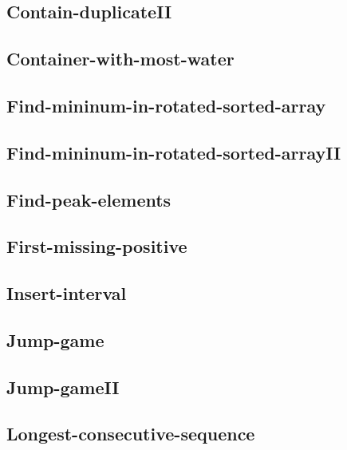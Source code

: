 \documentclass[a4paper,10pt]{article}
\begin{document}
\begin{CJK}{UTF8}{gbsn}
\subsection{Contain-duplicateII}


\subsection{Container-with-most-water}


\subsection{Find-mininum-in-rotated-sorted-array}


\subsection{Find-mininum-in-rotated-sorted-arrayII}


\subsection{Find-peak-elements}


\subsection{First-missing-positive}


\subsection{Insert-interval}


\subsection{Jump-game}


\subsection{Jump-gameII}


\subsection{Longest-consecutive-sequence}



\end{CJK}
\end{document}
